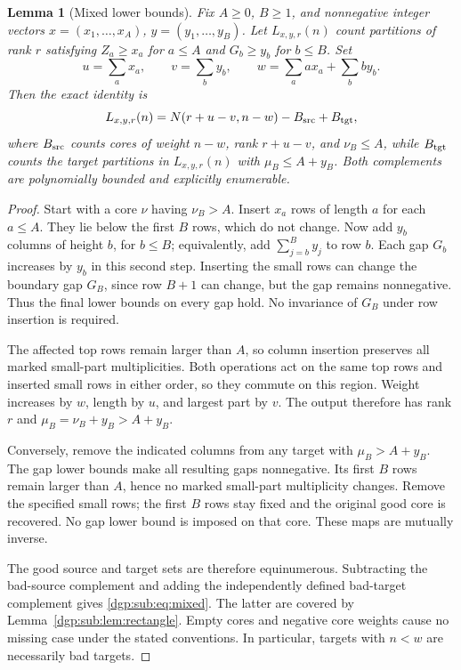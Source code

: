 \documentclass[11pt,letterpaper]{article}
\numberwithin{equation}{section}
\newtheorem{lemma}[theorem]{Lemma}
\theoremstyle{remark}\newtheorem{remark}[theorem]{Remark}
\begin{document}
\begin{lemma}[Mixed lower bounds]\label{dgp:sub:lem:mixed}
Fix $A\geq0$, $B\geq1$, and nonnegative integer vectors
$x=(x_1,\ldots,x_A)$, $y=(y_1,\ldots,y_B)$. Let
$L_{x,y,r}(n)$ count partitions of rank $r$ satisfying
$Z_a\geq x_a$ for $a\leq A$ and $G_b\geq y_b$ for $b\leq B$.
Set
\[
 u=\sum_a x_a,\qquad v=\sum_b y_b,\qquad
 w=\sum_a ax_a+\sum_b by_b.
\]
Then the exact identity is
\begin{equation}\label{dgp:sub:eq:mixed}
 L_{x,y,r}(n)=N(r+u-v,n-w)-B_{\rm src}+B_{\rm tgt},
\end{equation}
where $B_{\rm src}$ counts cores of weight $n-w$, rank $r+u-v$,
and $\nu_B\leq A$, while $B_{\rm tgt}$ counts the target partitions
in $L_{x,y,r}(n)$ with $\mu_B\leq A+y_B$.
Both complements are polynomially bounded and explicitly enumerable.
\end{lemma}
\begin{proof}
Start with a core $\nu$ having $\nu_B>A$. Insert $x_a$ rows of
length $a$ for each $a\leq A$. They lie below the first $B$ rows,
which do not change. Now add $y_b$ columns of height $b$, for
$b\leq B$; equivalently, add $\sum_{j=b}^{B}y_j$ to row $b$.
Each gap $G_b$ increases by $y_b$ in this second step. Inserting the
small rows can change the boundary gap $G_B$, since row $B+1$ can
change, but the gap remains nonnegative. Thus the final lower bounds
on every gap hold. No invariance of $G_B$ under row insertion is
required.

The affected top rows remain larger than $A$, so column insertion
preserves all marked small-part multiplicities. Both operations act
on the same top rows and inserted small rows in either order, so
they commute on this region. Weight increases by $w$, length by
$u$, and largest part by $v$. The output therefore has rank $r$
and $\mu_B=\nu_B+y_B>A+y_B$.

Conversely, remove the indicated columns from any target with
$\mu_B>A+y_B$. The gap lower bounds make all resulting gaps
nonnegative. Its first $B$ rows remain larger than $A$, hence no
marked small-part multiplicity changes. Remove the specified small
rows; the first $B$ rows stay fixed and the original good core is
recovered. No gap lower bound is imposed on that core. These maps
are mutually inverse.

The good source and target sets are therefore equinumerous.
Subtracting the bad-source complement and adding the independently
defined bad-target complement gives \eqref{dgp:sub:eq:mixed}. The latter
are covered by Lemma~\ref{dgp:sub:lem:rectangle}. Empty cores and negative
core weights cause no missing case under the stated conventions.
In particular, targets with $n<w$ are necessarily bad targets.
\end{proof}
\end{document}

